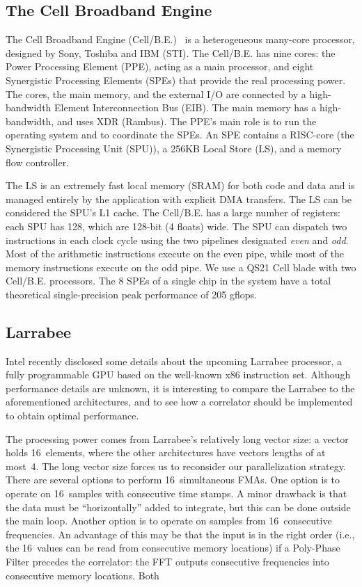 \documentclass{article}
\begin{document}
\subsection{The Cell Broadband Engine}

The Cell Broadband Engine (\mbox{Cell/B.E.})~\cite{cell} is a
heterogeneous many-core processor, designed by Sony, Toshiba and IBM
(STI).  The \mbox{Cell/B.E.} has nine cores: the Power Processing
Element (PPE), acting as a main processor, and eight Synergistic
Processing Elements (SPEs) that provide the real processing power.
The cores, the main memory, and the external I/O are connected by a
high-bandwidth Element Interconnection Bus (EIB).  The main memory has
a high-bandwidth, and uses XDR (Rambus).  The PPE's main role is to
run the operating system and to coordinate the SPEs.  An SPE contains
a RISC-core (the Synergistic Processing Unit (SPU)), a 256KB Local
Store (LS), and a memory flow controller.

The LS is an extremely fast local memory (SRAM) for both code and data
and is managed entirely by the application with explicit DMA
transfers.  The LS can be considered the SPU's L1 cache.  The
\mbox{Cell/B.E.} has a large number of registers: each SPU has 128,
which are 128-bit (4 floats) wide.  The SPU can dispatch two
instructions in each clock cycle using the two pipelines designated
\emph{even} and \emph{odd}. Most of the arithmetic instructions
execute on the even pipe, while most of the memory instructions
execute on the odd pipe.  We use a QS21 Cell blade with two
\mbox{Cell/B.E.} processors.  The 8 SPEs of a single chip in the
system have a total theoretical single-precision peak performance of
205 gflops.


\subsection{Larrabee}

Intel recently disclosed some details about the upcoming Larrabee processor,
a fully programmable GPU based on the well-known x86 instruction set.
Although performance details are unknown, it is interesting to compare the
Larrabee to the aforementioned architectures, and to see how a correlator
should be implemented to obtain optimal performance.

The processing power comes from Larrabee's relatively long vector size:
a vector holds 16~elements, where the other architectures have vectors lengths
of at most~4.
The long vector size forces us to reconsider our parallelization strategy.
There are several options to perform 16~simultaneous FMAs.
One option is to operate on 16~samples with consecutive time stamps.
A minor drawback is that the data must be ``horizontally'' added to integrate,
but this can be done outside the main loop.
Another option is to operate on samples from 16~consecutive frequencies.
An advantage of this may be that the input is in the right order (i.e.,
the 16~values can be read from consecutive memory locations) if a Poly-Phase
Filter precedes the correlator: the FFT outputs consecutive frequencies into
consecutive memory locations.
Both 
\end{document}
